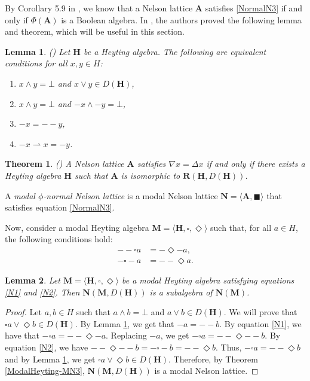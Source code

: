 \documentclass[pdflatex,sn-mathphys-num]{sn-jnl}%
\newtheorem{lemma}{Lemma}
\newcommand{\A}{\mathbf{A}}
\newcommand{\R}[2]{\mathbf{R}(#1,#2)}
\newcommand{\He}{\mathbf{H}}
\theoremstyle{thmstyleone}%
\newtheorem{theorem}{Theorem}%
\theoremstyle{thmstyletwo}%
\theoremstyle{thmstylethree}%
\begin{document}
By Corollary 5.9 in \cite{Busaniche}, we know that a Nelson lattice $\A$ satisfies \ref{NormalN3} if and only if $\Phi(\A)$ is a Boolean algebra. In \cite{Busaniche}, the authors proved the following lemma and theorem, which will be useful in this section.

\begin{lemma} (\cite[Lemma 6.2]{Busaniche})  \label{DensequivHeyting}
Let $\He$ be a Heyting algebra. The following are equivalent conditions for all $x,y\in H$:
\begin{enumerate}
    \item $x\wedge y=\bot$ and $x\vee y\in D(\He)$, 
    \item $x\wedge y=\bot$ and $- x\wedge - y=\bot$,
    \item $- x= - - y$,
    \item $- x \rightharpoonup x = - y$.
\end{enumerate}
\end{lemma}

\begin{theorem} (\cite[Theorem 6.3]{Busaniche}) \label{CharacNormalNelsonAlgebras}
A Nelson lattice $\A$ satisfies $\nabla x=\Delta x$ if and only if there exists a Heyting algebra $\He$ such that $\A$ is isomorphic to $\R{\He}{D(\He)}$. 
\end{theorem}

A \emph{modal $\phi$-normal Nelson lattice} is a modal Nelson lattice $\mathbf{N}=\langle\A,\blacksquare\rangle$ that satisfies equation \eqref{NormalN3}. 

Now, consider a modal Heyting algebra $\mathbf{M}=\langle \He,\square,\Diamond\rangle$ such that, for all $a\in H$, the following conditions hold:
\begin{align}
    - - \square a &= - \Diamond - a,\label{N1}\\
    - \square - a &= - - \Diamond a.\label{N2}
\end{align}

\begin{lemma} \label{normal1}
Let $\mathbf{M}=\langle \He, \square,\Diamond\rangle$ be a modal Heyting algebra satisfying equations \eqref{N1} and \eqref{N2}. Then $\mathbf{N}(\mathbf{M},D(\He))$ is a subalgebra of $\mathbf{N}(\mathbf{M})$.
\end{lemma}

\begin{proof}
Let $a,b\in H$ such that $a\wedge b=\bot$ and $a\vee b\in D(\He)$. We will prove that $\square a\vee \Diamond b\in D(\He)$. By Lemma \ref{DensequivHeyting}, we get that $- a=-- b$. By equation \eqref{N1}, we have that $-\square a=--\Diamond -a$. Replacing $-a$, we get $-\square a=--\Diamond --b$. By equation \eqref{N2}, we have $--\Diamond --b=-\square -b=--\Diamond b$. Thus, $-\square a=--\Diamond b$ and by Lemma \ref{DensequivHeyting}, we get $\square a\vee \Diamond b\in D(\He)$. Therefore, by Theorem \ref{ModalHeyting-MN3}, $\mathbf{N}(\mathbf{M},D(\He))$ is a modal Nelson lattice.
\end{proof}
\end{document}
